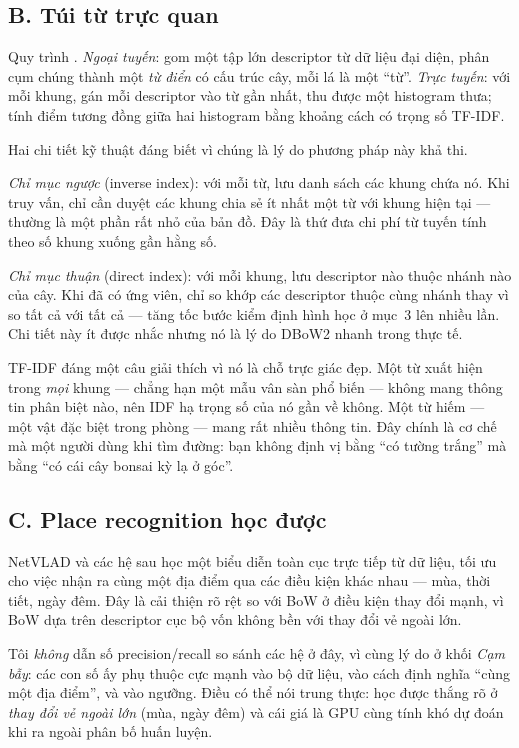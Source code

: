 \documentclass[../../vslam.tex]{subfiles}
\begin{document}
\subsection{B. Túi từ trực quan}

Quy trình \cite{galvezlopez2012dbow2,nister2006vocabtree}. \emph{Ngoại tuyến}: gom một tập lớn descriptor từ dữ liệu đại diện, phân cụm chúng thành một \emph{từ điển} có cấu trúc cây, mỗi lá là một ``từ''. \emph{Trực tuyến}: với mỗi khung, gán mỗi descriptor vào từ gần nhất, thu được một histogram thưa; tính điểm tương đồng giữa hai histogram bằng khoảng cách có trọng số TF-IDF.

Hai chi tiết kỹ thuật đáng biết vì chúng là lý do phương pháp này khả thi.

\emph{Chỉ mục ngược} (inverse index): với mỗi từ, lưu danh sách các khung chứa nó. Khi truy vấn, chỉ cần duyệt các khung chia sẻ ít nhất một từ với khung hiện tại --- thường là một phần rất nhỏ của bản đồ. Đây là thứ đưa chi phí từ tuyến tính theo số khung xuống gần hằng số.

\emph{Chỉ mục thuận} (direct index): với mỗi khung, lưu descriptor nào thuộc nhánh nào của cây. Khi đã có ứng viên, chỉ so khớp các descriptor thuộc cùng nhánh thay vì so tất cả với tất cả --- tăng tốc bước kiểm định hình học ở mục~3 lên nhiều lần. Chi tiết này ít được nhắc nhưng nó là lý do DBoW2 nhanh trong thực tế.

TF-IDF đáng một câu giải thích vì nó là chỗ trực giác đẹp. Một từ xuất hiện trong \emph{mọi} khung --- chẳng hạn một mẫu vân sàn phổ biến --- không mang thông tin phân biệt nào, nên IDF hạ trọng số của nó gần về không. Một từ hiếm --- một vật đặc biệt trong phòng --- mang rất nhiều thông tin. Đây chính là cơ chế mà một người dùng khi tìm đường: bạn không định vị bằng ``có tường trắng'' mà bằng ``có cái cây bonsai kỳ lạ ở góc''.

\subsection{C. Place recognition học được}

NetVLAD \cite{arandjelovic2018netvlad} và các hệ sau học một biểu diễn toàn cục trực tiếp từ dữ liệu, tối ưu cho việc nhận ra cùng một địa điểm qua các điều kiện khác nhau --- mùa, thời tiết, ngày đêm. Đây là cải thiện rõ rệt so với BoW ở điều kiện thay đổi mạnh, vì BoW dựa trên descriptor cục bộ vốn không bền với thay đổi vẻ ngoài lớn.

Tôi \emph{không} dẫn số precision/recall so sánh các hệ ở đây, vì cùng lý do ở  khối \emph{Cạm bẫy}: các con số ấy phụ thuộc cực mạnh vào bộ dữ liệu, vào cách định nghĩa ``cùng một địa điểm'', và vào ngưỡng. Điều có thể nói trung thực: học được thắng rõ ở \emph{thay đổi vẻ ngoài lớn} (mùa, ngày đêm) và cái giá là GPU cùng tính khó dự đoán khi ra ngoài phân bố huấn luyện.
\end{document}
